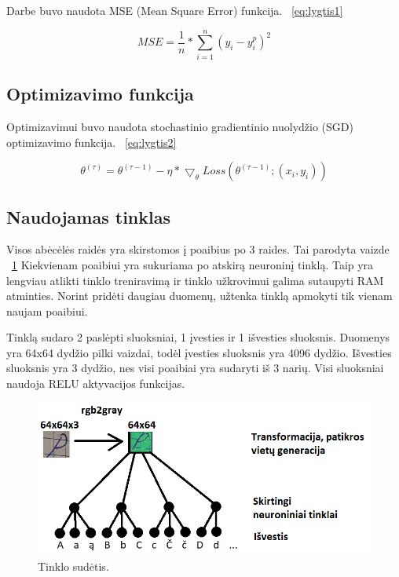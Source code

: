 \documentclass[conference]{IEEEtran}
\begin{document}
Darbe buvo naudota MSE (Mean Square Error) funkcija. ~\eqref{eq:lygtis1}

\begin{equation}
MSE = \frac{1}{n} * \sum_{i=1}^{n} (y_{i} - y_{i}^{p})^{2}
\label{eq:lygtis1}
\end{equation}

\subsection{Optimizavimo funkcija}

Optimizavimui buvo naudota stochastinio gradientinio nuolydžio
(SGD) optimizavimo funkcija. ~\eqref{eq:lygtis2}

\begin{equation}
\theta^{(\tau)} = \theta^{(\tau - 1)} - \eta * \bigtriangledown_{\theta} Loss(\theta^{(\tau - 1)};(x_{i}, y_{i}))
\label{eq:lygtis2}
\end{equation}

\subsection{Naudojamas tinklas}

Visos abėcėlės raidės yra skirstomos į poaibius po 3 raides. Tai parodyta vaizde ~\ref{fig1} Kiekvienam poaibiui yra
sukuriama po atskirą neuroninį tinklą. Taip yra lengviau atlikti tinklo treniravimą
ir tinklo užkrovimui galima sutaupyti RAM atminties. Norint pridėti daugiau
duomenų, užtenka tinklą apmokyti tik vienam naujam poaibiui.
\par
Tinklą sudaro 2 paslėpti sluoksniai, 1 įvesties ir 1 išvesties sluoksnis. Duomenys
yra 64x64 dydžio pilki vaizdai, todėl įvesties sluoksnis yra 4096 dydžio. Išvesties
sluoksnis yra 3 dydžio, nes visi poaibiai yra sudaryti iš 3 narių. Visi sluoksniai naudoja
RELU aktyvacijos funkcijas.

\begin{figure}[!h] %
\centerline{\includegraphics[scale=0.4] {images/1.png}}
\caption{Tinklo sudėtis.}
\label{fig1}
\end{figure}
\end{document}
